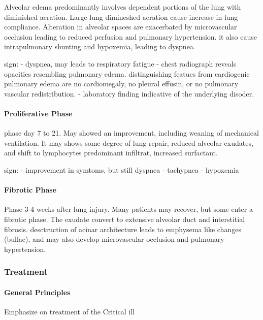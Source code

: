 \documentclass[
  letterpaper,
  DIV=11,
  numbers=noendperiod]{scrreprt}
\let\oldparagraph\paragraph
\renewcommand{\paragraph}[1]{\oldparagraph{#1}\mbox{}}
\begin{document}
Alveolar edema predominantly involves dependent portions of the lung
with diminished aeration. Large lung dimineshed aeration cause increase
in lung compliance. Alteration in alveolar spaces are exacerbated by
microvascular occlusion leading to reduced perfusion and pulmonary
hypertension. it also cause intrapulmonary shunting and hypoxemia,
leading to dyspnea.

sign: - dyspnea, may leads to respiratory fatigue - chest radiograph
reveals opacities resembling pulmonary edema. distinguishing featues
from cardiogenic pulmonary edema are no cardiomegaly, no pleural
effusin, or no pulmonary vascular redistribution. - laboratory finding
indicative of the underlying disoder.

\paragraph{Proliferative Phase}\label{proliferative-phase}

phase day 7 to 21. May showed an improvement, including weaning of
mechanical ventilation. It may shows some degree of lung repair, reduced
alveolar exudates, and shift to lymphocytes predominant infiltrat,
increased surfactant.

sign: - improvement in symtoms, but still dyspnea - tachypnea -
hypoxemia

\paragraph{Fibrotic Phase}\label{fibrotic-phase}

Phase 3-4 weeks after lung injury. Many patients may recover, but some
enter a fibrotic phase. The exudate convert to extensive alveolar duct
and interstitial fibrosis. desctruction of acinar architecture leads to
emphysema like changes (bullae), and may also develop microvascular
occlusion and pulmonary hypertension.

\subsubsection{Treatment}\label{treatment}

\paragraph{General Principles}\label{general-principles}

Emphasize on treatment of the Critical ill
\end{document}
